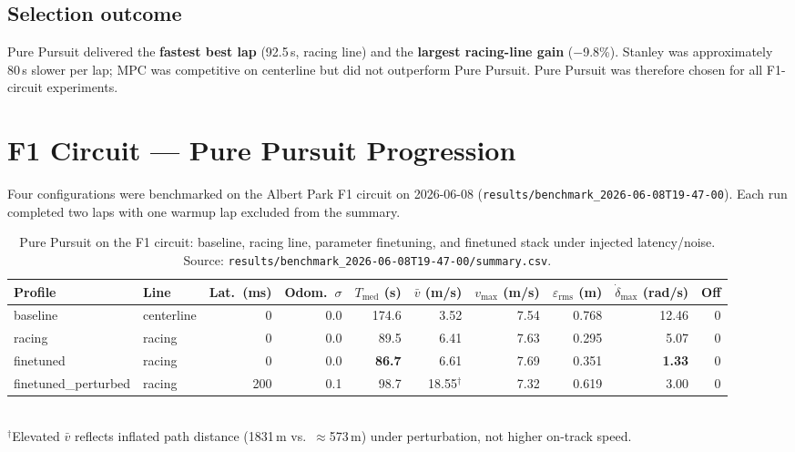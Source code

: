 \documentclass[11pt,a4paper]{article}
\newcommand{\runref}[1]{\texttt{results/#1}}
\newcommand{\best}[1]{\textbf{#1}}
\begin{document}
\subsection{Selection outcome}
Pure Pursuit delivered the \best{fastest best lap} (92.5\,s, racing line)
and the \best{largest racing-line gain} ($-$9.8\%).
Stanley was approximately 80\,s slower per lap; MPC was competitive on
centerline but did not outperform Pure Pursuit.
Pure Pursuit was therefore chosen for all F1-circuit experiments.

\section{F1 Circuit --- Pure Pursuit Progression}
\label{sec:f1}

Four configurations were benchmarked on the Albert Park F1 circuit on 2026-06-08
(\runref{benchmark\_2026-06-08T19-47-00}).
Each run completed two laps with one warmup lap excluded from the summary.

\begin{table}[H]
  \centering
  \caption{Pure Pursuit on the F1 circuit: baseline, racing line, parameter finetuning,
           and finetuned stack under injected latency/noise.
           Source: \runref{benchmark\_2026-06-08T19-47-00/summary.csv}.}
  \label{tab:f1-progression}
  \small
  \begin{tabular}{@{}llrrrrrrrr@{}}
    \toprule
    Profile & Line &
    Lat.\ (ms) & Odom.\ $\sigma$ &
    $T_{\mathrm{med}}$ (s) & $\bar{v}$ (m/s) & $v_{\max}$ (m/s) &
    $\varepsilon_{\mathrm{rms}}$ (m) & $\dot{\delta}_{\max}$ (rad/s) & Off \\
    \midrule
    baseline             & centerline & 0   & 0.0  &
        174.6 & 3.52 & 7.54 & 0.768 & 12.46 & 0 \\
    racing               & racing     & 0   & 0.0  &
         89.5 & 6.41 & 7.63 & 0.295 &  5.07 & 0 \\
    finetuned            & racing     & 0   & 0.0  &
         \best{86.7} & 6.61 & 7.69 & 0.351 & \best{1.33} & 0 \\
    finetuned\_perturbed & racing     & 200 & 0.1  &
         98.7 & 18.55$^{\dag}$ & 7.32 & 0.619 & 3.00 & 0 \\
    \bottomrule
  \end{tabular}
  \\[0.4em]
  \footnotesize $^{\dag}$Elevated $\bar{v}$ reflects inflated path distance
  (1831\,m vs.\ $\approx$573\,m) under perturbation, not higher
  on-track speed.
\end{table}
\end{document}
